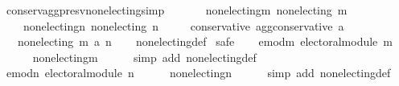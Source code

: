 \begin{isabellebody}
{}
\isamarkuptrue%
%
\endisatagdocument
{\isafolddocument}%
%
\isadelimdocument
%
\endisadelimdocument
{}\isamarkupfalse%
\ conserv{\isacharunderscore}{\kern0pt}agg{\isacharunderscore}{\kern0pt}presv{\isacharunderscore}{\kern0pt}non{\isacharunderscore}{\kern0pt}electing{\isacharbrackleft}{\kern0pt}simp{\isacharbrackright}{\kern0pt}{\isacharcolon}{\kern0pt}\isanewline
\ \ \isanewline
\ \ \ \ non{\isacharunderscore}{\kern0pt}electing{\isacharunderscore}{\kern0pt}m{\isacharcolon}{\kern0pt}\ {\isachardoublequoteopen}non{\isacharunderscore}{\kern0pt}electing\ m{\isachardoublequoteclose}\ \isanewline
\ \ \ \ non{\isacharunderscore}{\kern0pt}electing{\isacharunderscore}{\kern0pt}n{\isacharcolon}{\kern0pt}\ {\isachardoublequoteopen}non{\isacharunderscore}{\kern0pt}electing\ n{\isachardoublequoteclose}\ \isanewline
\ \ \ \ conservative{\isacharcolon}{\kern0pt}\ {\isachardoublequoteopen}agg{\isacharunderscore}{\kern0pt}conservative\ a{\isachardoublequoteclose}\isanewline
\ \ \ {\isachardoublequoteopen}non{\isacharunderscore}{\kern0pt}electing\ {\isacharparenleft}{\kern0pt}m\ {\isasymparallel}\isactrlsub a\ n{\isacharparenright}{\kern0pt}{\isachardoublequoteclose}\isanewline
%
\isadelimproof
\ \ %
\endisadelimproof
%
\isatagproof
{}\isamarkupfalse%
\ non{\isacharunderscore}{\kern0pt}electing{\isacharunderscore}{\kern0pt}def\isanewline
{}\isamarkupfalse%
\ {\isacharparenleft}{\kern0pt}safe{\isacharparenright}{\kern0pt}\isanewline
\ \ \isamarkupfalse%
\ emod{\isacharunderscore}{\kern0pt}m{\isacharcolon}{\kern0pt}\ {\isachardoublequoteopen}electoral{\isacharunderscore}{\kern0pt}module\ m{\isachardoublequoteclose}\isanewline
\ \ \ \ \isamarkupfalse%
\ non{\isacharunderscore}{\kern0pt}electing{\isacharunderscore}{\kern0pt}m\isanewline
\ \ \ \ \isamarkupfalse%
\ {\isacharparenleft}{\kern0pt}simp\ add{\isacharcolon}{\kern0pt}\ non{\isacharunderscore}{\kern0pt}electing{\isacharunderscore}{\kern0pt}def{\isacharparenright}{\kern0pt}\isanewline
\ \ \isamarkupfalse%
\ emod{\isacharunderscore}{\kern0pt}n{\isacharcolon}{\kern0pt}\ {\isachardoublequoteopen}electoral{\isacharunderscore}{\kern0pt}module\ n{\isachardoublequoteclose}\isanewline
\ \ \ \ \isamarkupfalse%
\ non{\isacharunderscore}{\kern0pt}electing{\isacharunderscore}{\kern0pt}n\isanewline
\ \ \ \ \isamarkupfalse%
\ {\isacharparenleft}{\kern0pt}simp\ add{\isacharcolon}{\kern0pt}\ non{\isacharunderscore}{\kern0pt}electing{\isacharunderscore}{\kern0pt}def{\isacharparenright}{\kern0pt}\isanewline

\end{isabellebody}
